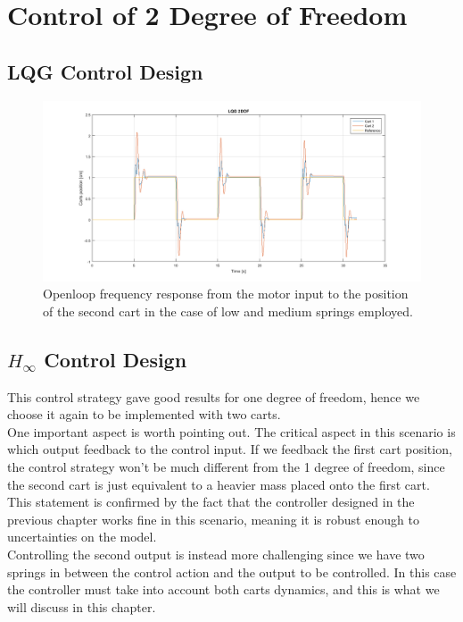 {\let\clearpage\relax \chapter{Control of 2 Degree of Freedom}}
\section{LQG Control Design}

\begin{figure}[h]
\centering
\includegraphics[width=0.5\linewidth]{img/lqg_2dof.png}
\caption{Openloop frequency response from the motor input to the position of the second cart in the case of low and medium springs employed.}
\label{fig:lqg2dof}
\end{figure}
\section{$H_\infty$ Control Design}
This control strategy gave good results for one degree of freedom, hence we choose it again to be implemented with two carts.\\

One important aspect is worth pointing out. The critical aspect in this scenario is which output feedback to the control input. If we feedback the first cart position, the control strategy won't be much different from the 1 degree of freedom, since the second cart is just equivalent to a heavier mass placed onto the first cart. This statement is confirmed by the fact that the controller designed in the previous chapter works fine in this scenario, meaning it is robust enough to uncertainties on the model.\\

Controlling the second output is instead more challenging since we have two springs in between the control action and the output to be controlled. In this case the controller must take into account both carts dynamics, and this is what we will discuss in this chapter.\\


